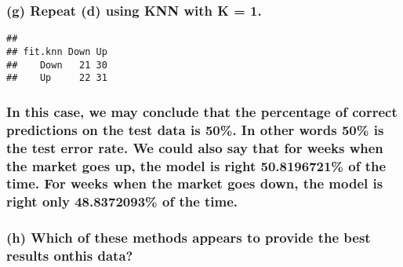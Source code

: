 \documentclass[]{article}
\newenvironment{Shaded}{\begin{snugshade}}{\end{snugshade}}
\newcommand{\KeywordTok}[1]{\textcolor[rgb]{0.13,0.29,0.53}{\textbf{#1}}}
\newcommand{\DataTypeTok}[1]{\textcolor[rgb]{0.13,0.29,0.53}{#1}}
\newcommand{\DecValTok}[1]{\textcolor[rgb]{0.00,0.00,0.81}{#1}}
\newcommand{\StringTok}[1]{\textcolor[rgb]{0.31,0.60,0.02}{#1}}
\newcommand{\OperatorTok}[1]{\textcolor[rgb]{0.81,0.36,0.00}{\textbf{#1}}}
\newcommand{\NormalTok}[1]{#1}
\begin{document}
\subsubsection{(g) Repeat (d) using KNN with K =
1.}\label{g-repeat-d-using-knn-with-k-1.}

\begin{Shaded}
\end{Shaded}

\begin{verbatim}
##        
## fit.knn Down Up
##    Down   21 30
##    Up     22 31
\end{verbatim}

\subsubsection{In this case, we may conclude that the percentage of
correct predictions on the test data is 50\%. In other words 50\% is the
test error rate. We could also say that for weeks when the market goes
up, the model is right 50.8196721\% of the time. For weeks when the
market goes down, the model is right only 48.8372093\% of the
time.}\label{in-this-case-we-may-conclude-that-the-percentage-of-correct-predictions-on-the-test-data-is-50.-in-other-words-50-is-the-test-error-rate.-we-could-also-say-that-for-weeks-when-the-market-goes-up-the-model-is-right-50.8196721-of-the-time.-for-weeks-when-the-market-goes-down-the-model-is-right-only-48.8372093-of-the-time.}

\subsubsection{(h) Which of these methods appears to provide the best
results onthis
data?}\label{h-which-of-these-methods-appears-to-provide-the-best-results-onthis-data}
\end{document}
